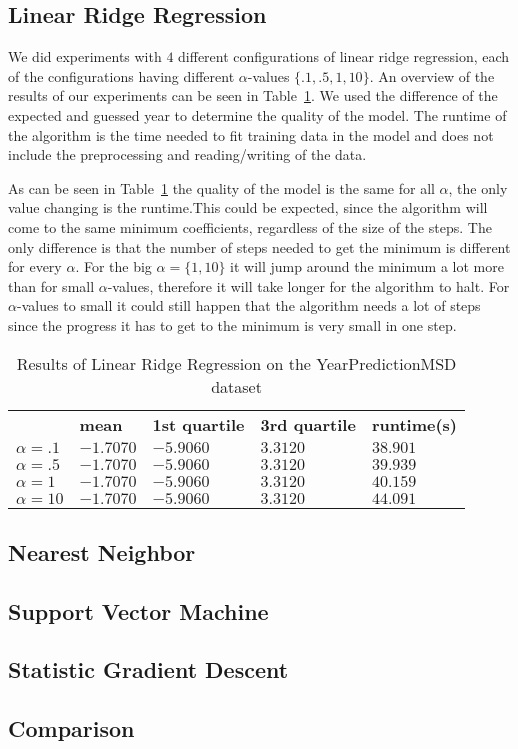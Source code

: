 \subsection{Linear Ridge Regression}
We did experiments with $4$ different configurations of linear ridge regression, each of the configurations having different $\alpha$-values $\{.1,.5,1,10\}$. An overview of the results of our experiments can be seen in Table~\ref{ypmsd:table:lrrresults}. We used the difference of the expected and guessed year to determine the quality of the model. The runtime of the algorithm is the time needed to fit training data in the model and does not include the preprocessing and reading/writing of the data.\par
As can be seen in Table~\ref{ypmsd:table:lrrresults} the quality of the model is the same for all $\alpha$, the only value changing is the runtime.This could be expected, since the algorithm will come to the same minimum coefficients, regardless of the size of the steps. The only difference is that the number of steps needed to get the minimum is different for every $\alpha$. For the big $\alpha=\{1,10\}$ it will jump around the minimum a lot more than for small $\alpha$-values, therefore it will take longer for the algorithm to halt. For $\alpha$-values to small it could still happen that the algorithm needs a lot of steps since the progress it has to get to the minimum is very small in one step.
\begin{table}[p]
	\begin{center}
\begin{tabular}{l|l|l|l|l}
	&\textbf{mean}&\textbf{1st quartile}&\textbf{3rd quartile}&\textbf{runtime(s)}\\
$\alpha=.1$&$-1.7070$&$-5.9060$&$3.3120$&$38.901$\\
$\alpha=.5$&$-1.7070$&$-5.9060$&$3.3120$&$39.939$\\
$\alpha=1$&$-1.7070$&$-5.9060$&$3.3120$&$40.159$\\
$\alpha=10$&$-1.7070$&$-5.9060$&$3.3120$&$44.091$\\
\end{tabular}
\end{center}
\caption{Results of Linear Ridge Regression on the YearPredictionMSD dataset\label{ypmsd:table:lrrresults}}
\end{table}
\subsection{Nearest Neighbor}
\subsection{Support Vector Machine}
\subsection{Statistic Gradient Descent}

\subsection{Comparison}
